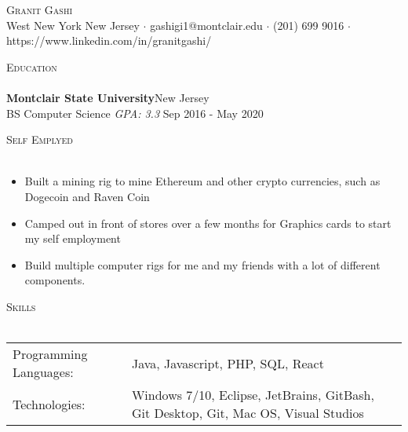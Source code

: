 \documentclass[a4paper]{article}
\newcommand{\lineunder} {
    \vspace*{-8pt} \\
    \hspace*{-18pt} \hrulefill \\
}
\newcommand{\header} [1] {
    {\hspace*{-18pt}\vspace*{6pt} \textsc{#1}}
    \vspace*{-6pt} \lineunder
}
\begin{document}
\vspace*{-40pt}

    

\vspace*{-10pt}
\begin{center}
	{\Huge \scshape {Granit Gashi}}\\
	West New York New Jersey $\cdot$ gashigi1@montclair.edu $\cdot$ (201) 699 9016 $\cdot$ https://www.linkedin.com/in/granitgashi/\\
\end{center}

\header{Education}
\textbf{Montclair State University}\hfill New Jersey\\
BS Computer Science \textit{GPA: 3.3} \hfill Sep 2016 - May 2020\\
\vspace{2mm}

\header{Self Emplyed}
\vspace{1mm}

\vspace{-1mm}
\begin{itemize} \itemsep 1pt
	\item Built a mining rig to mine Ethereum and other crypto currencies, such as Dogecoin and Raven Coin
	\item Camped out in front of stores over a few months for Graphics cards to start my self employment
	\item Build multiple computer rigs for me and my friends with a lot of different components.
\end{itemize}

\header{Skills}
\begin{tabular}{ l l }
	Programming Languages: & Java, Javascript, PHP, SQL, React                                                   \\
	Technologies:          & Windows 7/10, Eclipse, JetBrains, GitBash, Git Desktop, Git, Mac OS, Visual Studios \\
\end{tabular}
\vspace{2mm}
\end{document}
